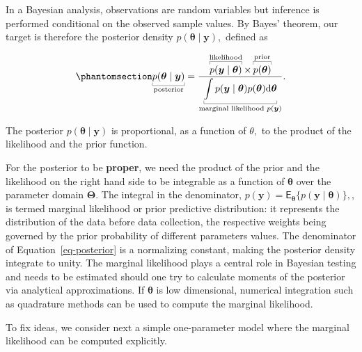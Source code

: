 \documentclass[
  11pt,
  letterpaper,
]{scrbook}
\theoremstyle{definition}
\theoremstyle{plain}
\theoremstyle{plain}
\theoremstyle{plain}
\theoremstyle{definition}
\theoremstyle{definition}
\theoremstyle{plain}
\theoremstyle{plain}
\theoremstyle{remark}
\begin{document}
In a Bayesian analysis, observations are random variables but inference
is performed conditional on the observed sample values. By Bayes'
theorem, our target is therefore the posterior density
\(p(\boldsymbol{\theta} \mid \boldsymbol{y}),\) defined as

\begin{equation}\protect\phantomsection\label{eq-posterior}{
\underbracket[0.25pt]{p(\boldsymbol{\theta} \mid \boldsymbol{y})}_{\text{posterior}} = \frac{\overbracket[0.25pt]{p(\boldsymbol{y} \mid \boldsymbol{\theta})}^{\text{likelihood}} \times  \overbracket[0.25pt]{p(\boldsymbol{\theta})}^{\text{prior}}}{\underbracket[0.25pt]{\int p(\boldsymbol{y} \mid \boldsymbol{\theta}) p(\boldsymbol{\theta}) \mathrm{d} \boldsymbol{\theta}}_{\text{marginal likelihood }p(\boldsymbol{y})}}.
}\end{equation}

The posterior \(p(\boldsymbol{\theta} \mid \boldsymbol{y})\) is
proportional, as a function of \(\theta,\) to the product of the
likelihood and the prior function.

For the posterior to be \textbf{proper}, we need the product of the
prior and the likelihood on the right hand side to be integrable as a
function of \(\boldsymbol{\theta}\) over the parameter domain
\(\boldsymbol{\Theta}.\) The integral in the denominator,
\(p(\boldsymbol{y}) = \mathsf{E}_{\boldsymbol{\theta}}\{p(\boldsymbol{y} \mid \boldsymbol{\theta})\},\),
is termed marginal likelihood or prior predictive distribution: it
represents the distribution of the data before data collection, the
respective weights being governed by the prior probability of different
parameters values. The denominator of Equation~\ref{eq-posterior} is a
normalizing constant, making the posterior density integrate to unity.
The marginal likelihood plays a central role in Bayesian testing and
needs to be estimated should one try to calculate moments of the
posterior via analytical approximations. If \(\boldsymbol{\theta}\) is
low dimensional, numerical integration such as quadrature methods can be
used to compute the marginal likelihood.

To fix ideas, we consider next a simple one-parameter model where the
marginal likelihood can be computed explicitly.
\end{document}
